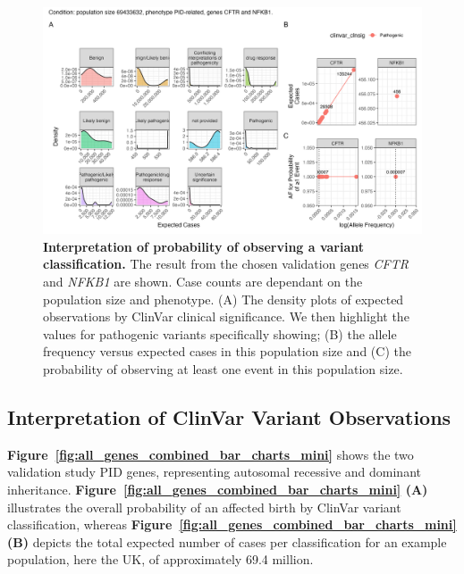\begin{figure}[ht]
  \centering
  \includegraphics[width=\textwidth]{../images/validation_studies_scatterdense_expected_prob.png}
  \caption{\textbf{Interpretation of probability of observing a variant classification.} 
 The result from the chosen validation genes \textit{CFTR} and \textit{NFKB1} are shown. 
 Case counts are dependant on the population size and phenotype.
(A) The density plots of expected observations by ClinVar clinical significance. 
We then highlight the values for pathogenic variants specifically showing;
(B) the allele frequency versus expected cases in this population size and
(C) the probability of observing at least one event in this population size.}
  \label{fig:validation_scatter_dense}
\end{figure}

\subsection{Interpretation of ClinVar Variant Observations}

\textbf{Figure~\ref{fig:all_genes_combined_bar_charts_mini}} shows  the two validation study PID genes, representing autosomal recessive and dominant inheritance. \textbf{Figure~\ref{fig:all_genes_combined_bar_charts_mini} (A)}   illustrates the overall probability of an affected birth by ClinVar variant classification, whereas \textbf{Figure~\ref{fig:all_genes_combined_bar_charts_mini}  (B)}  depicts the total expected number of cases per classification for an example population, here the UK, of approximately 69.4 million. 


